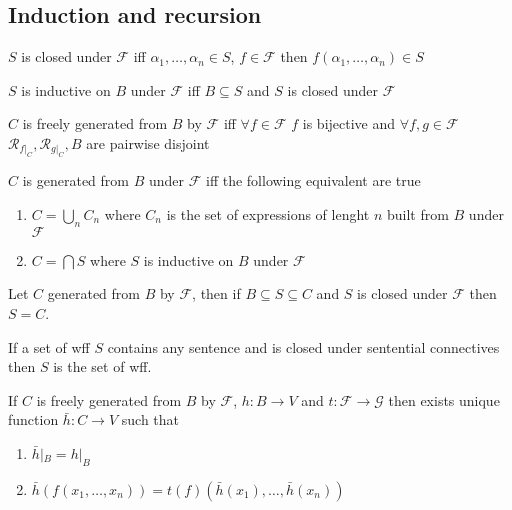 \documentclass[../../main.tex]{subfiles}
\begin{document}
\subsection{Induction and recursion}


\begin{definition}
    $S$ is closed under $\mathcal{F}$ iff $\alpha_1,\dots,\alpha_n\in S$, $f\in\mathcal{F}$ then $f(\alpha_1,\dots,\alpha_n)\in S$
\end{definition}
\begin{definition}
    $S$ is inductive on $B$ under $\mathcal{F}$ iff  $B\subseteq S$ and $S$ is closed under $\mathcal{F}$
\end{definition}
\begin{definition}
    $C$ is freely generated from $B$ by $\mathcal{F}$ iff $\forall f\in\mathcal{F}$ $f$ is bijective and $\forall f,g\in \mathcal{F}$ $\mathcal{R}_{f|_C}, \mathcal{R}_{g|_C}, B$ are pairwise disjoint
\end{definition}
\begin{definition}
    $C$ is generated from $B$ under $\mathcal{F}$ iff the following equivalent are true
    \begin{enumerate}
        \item $C=\bigcup_n C_n$ where $C_n$ is the set of expressions of lenght $n$ built from $B$ under $\mathcal{F}$
        \item $C=\bigcap S$ where $S$ is inductive on $B$ under $\mathcal{F}$
    \end{enumerate}
\end{definition}
\begin{theorem}
    Let $C$ generated from $B$ by $\mathcal{F}$, then if $B\subseteq S \subseteq C$ and $S$ is closed under $\mathcal{F}$ then $S=C$.
\end{theorem}
\begin{corollary}
    If a set of wff $S$ contains any sentence and is closed under sentential connectives then $S$ is the set of wff.
\end{corollary}
\begin{theorem}
    If $C$ is freely generated from $B$ by $\mathcal{F}$, $h:B\rightarrow V$ and $t:\mathcal{F}\rightarrow\mathcal{G}$ then exists unique function $\bar{h}: C\rightarrow V$ such that
    \begin{enumerate}
        \item $\bar{h}|_B = h|_B$
        \item $\bar{h}(f(x_1,\dots,x_n)) = t(f)(\bar{h}(x_1),\dots,\bar{h}(x_n))$
    \end{enumerate}
\end{theorem}
\end{document}
